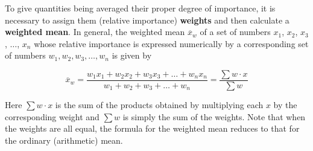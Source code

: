 \documentclass{ximera}
\begin{document}
To give quantities being averaged their proper degree of importance, it is necessary to assign them (relative importance) \textbf{weights} and then calculate a
\textbf{weighted mean}. In general, the weighted mean $\overline{x}_w$ of a set of numbers $x_1$, $x_2$, $x_3$, $\ldots$, $x_n$ whose relative importance is expressed numerically by a corresponding set of numbers $w_1, w_2, w_3,\ldots, w_n$ is given by

$$
\overline{x}_w=\dfrac{w_1x_1+w_2x_2+w_3x_3+\ldots+w_nx_n}{w_1+w_2+w_3+\ldots+w_n}=\dfrac{\sum w\cdot x}{\sum w}
$$

Here $\sum w\cdot x$ is the sum of the products obtained by multiplying each $x$ by the corresponding weight and $\sum w$ is simply the sum of the weights. Note that when the weights are all equal, the formula for the weighted mean reduces to that for the ordinary (arithmetic) mean.

\begin{question}



\end{question}


\begin{question}



\end{question}


\begin{question}



\end{question}


\begin{question}



\end{question}
\end{document}
